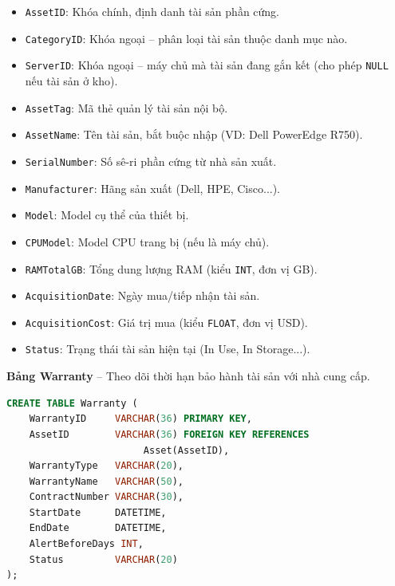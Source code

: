 \begin{itemize}[leftmargin=2em]
    \item \texttt{AssetID}: Khóa chính, định danh tài sản phần cứng.
    \item \texttt{CategoryID}: Khóa ngoại -- phân loại tài sản thuộc danh mục nào.
    \item \texttt{ServerID}: Khóa ngoại -- máy chủ mà tài sản đang gắn kết (cho phép \texttt{NULL} nếu tài sản ở kho).
    \item \texttt{AssetTag}: Mã thẻ quản lý tài sản nội bộ.
    \item \texttt{AssetName}: Tên tài sản, bắt buộc nhập (VD: Dell PowerEdge R750).
    \item \texttt{SerialNumber}: Số sê-ri phần cứng từ nhà sản xuất.
    \item \texttt{Manufacturer}: Hãng sản xuất (Dell, HPE, Cisco...).
    \item \texttt{Model}: Model cụ thể của thiết bị.
    \item \texttt{CPUModel}: Model CPU trang bị (nếu là máy chủ).
    \item \texttt{RAMTotalGB}: Tổng dung lượng RAM (kiểu \texttt{INT}, đơn vị GB).
    \item \texttt{AcquisitionDate}: Ngày mua/tiếp nhận tài sản.
    \item \texttt{AcquisitionCost}: Giá trị mua (kiểu \texttt{FLOAT}, đơn vị USD).
    \item \texttt{Status}: Trạng thái tài sản hiện tại (In Use, In Storage...).
\end{itemize}

\vspace{0.5em}
\noindent\textbf{Bảng Warranty} -- Theo dõi thời hạn bảo hành tài sản với nhà cung cấp.

\begin{tcolorbox}[colback=gray!5, colframe=gray!60, title={\textbf{CREATE TABLE Warranty}}, fonttitle=\bfseries\small, boxrule=0.5pt, arc=2pt]
\begin{lstlisting}[language=SQL, basicstyle=\ttfamily\small, breaklines=true, showstringspaces=false, keywordstyle=\bfseries\color{blue!70!black}, stringstyle=\color{red!70!black}, commentstyle=\itshape\color{green!50!black}]
CREATE TABLE Warranty (
    WarrantyID     VARCHAR(36) PRIMARY KEY,
    AssetID        VARCHAR(36) FOREIGN KEY REFERENCES
                        Asset(AssetID),
    WarrantyType   VARCHAR(20),
    WarrantyName   VARCHAR(50),
    ContractNumber VARCHAR(30),
    StartDate      DATETIME,
    EndDate        DATETIME,
    AlertBeforeDays INT,
    Status         VARCHAR(20)
);
\end{lstlisting}
\end{tcolorbox}


